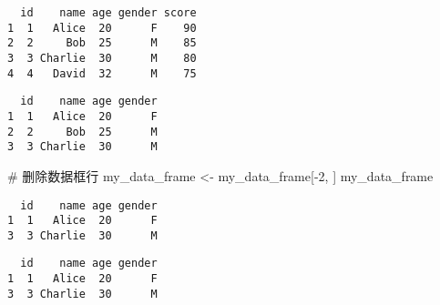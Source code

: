 \documentclass[
  letterpaper,
  DIV=11,
  numbers=noendperiod]{scrreprt}
\newenvironment{Shaded}{\begin{snugshade}}{\end{snugshade}}
\newcommand{\CommentTok}[1]{\textcolor[rgb]{0.37,0.37,0.37}{#1}}
\newcommand{\ConstantTok}[1]{\textcolor[rgb]{0.56,0.35,0.01}{#1}}
\newcommand{\DecValTok}[1]{\textcolor[rgb]{0.68,0.00,0.00}{#1}}
\newcommand{\FunctionTok}[1]{\textcolor[rgb]{0.28,0.35,0.67}{#1}}
\newcommand{\NormalTok}[1]{\textcolor[rgb]{0.00,0.23,0.31}{#1}}
\newcommand{\OtherTok}[1]{\textcolor[rgb]{0.00,0.23,0.31}{#1}}
\newcommand{\SpecialCharTok}[1]{\textcolor[rgb]{0.37,0.37,0.37}{#1}}
\begin{document}
\begin{verbatim}
  id    name age gender score
1  1   Alice  20      F    90
2  2     Bob  25      M    85
3  3 Charlie  30      M    80
4  4   David  32      M    75
\end{verbatim}

\begin{Shaded}
\end{Shaded}

\begin{verbatim}
  id    name age gender
1  1   Alice  20      F
2  2     Bob  25      M
3  3 Charlie  30      M
\end{verbatim}

\begin{Shaded}
\begin{Highlighting}[]
\CommentTok{\# 删除数据框行}
\NormalTok{my\_data\_frame }\OtherTok{\textless{}{-}}\NormalTok{ my\_data\_frame[}\SpecialCharTok{{-}}\DecValTok{2}\NormalTok{, ]}
\NormalTok{my\_data\_frame}
\end{Highlighting}
\end{Shaded}

\begin{verbatim}
  id    name age gender
1  1   Alice  20      F
3  3 Charlie  30      M
\end{verbatim}

\begin{Shaded}
\end{Shaded}

\begin{verbatim}
  id    name age gender
1  1   Alice  20      F
3  3 Charlie  30      M
\end{verbatim}

\begin{Shaded}
\end{Shaded}
\end{document}
